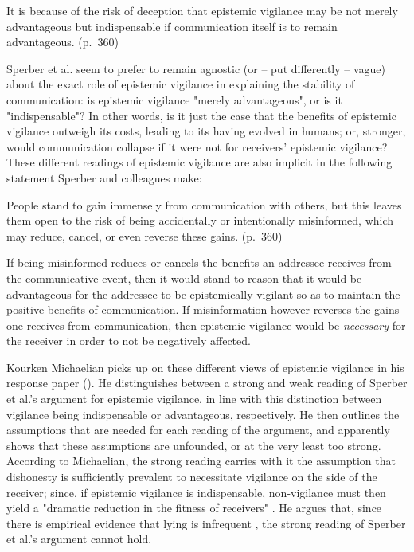 \begin{quoting}
    It is because of the risk of deception that epistemic vigilance may be not merely advantageous but indispensable if communication itself is to remain advantageous.
\hfill (p.~360)
\end{quoting}
Sperber et al. seem to prefer to remain agnostic (or -- put differently -- vague) about the exact role of epistemic vigilance in explaining the stability of communication: is epistemic vigilance "merely advantageous", or is it "indispensable"? In other words, is it just the case that the benefits of epistemic vigilance outweigh its costs, leading to its having evolved in humans; or, stronger, would communication collapse if it were not for receivers' epistemic vigilance?
These different readings of epistemic vigilance are also implicit in the following statement Sperber and colleagues make:
\begin{quoting}
    People stand to gain immensely from communication with others, but this leaves them open to the risk of being accidentally or intentionally misinformed, which may reduce, cancel, or even reverse these gains.
\hfill (p.~360)
\end{quoting}
If being misinformed reduces or cancels the benefits an addressee receives from the communicative event, then it would stand to reason that it would be advantageous for the addressee to be epistemically vigilant so as to maintain the positive benefits of communication. If misinformation however reverses the gains one receives from communication, then epistemic vigilance would be \emph{necessary} for the receiver in order to not be negatively affected.

Kourken Michaelian picks up on these different views of epistemic vigilance in his response paper (\citeyear{Michaelian13}). He distinguishes between a strong and weak reading of Sperber et al.'s argument for epistemic vigilance, in line with this distinction between vigilance being indispensable or advantageous, respectively.
He then outlines the assumptions that are needed for each reading of the argument, and apparently shows that these assumptions are unfounded, or at the very least too strong.
According to Michaelian, the strong reading carries with it the assumption that dishonesty is sufficiently prevalent to necessitate vigilance on the side of the receiver; since, if epistemic vigilance is indispensable, non-vigilance must then yield a "dramatic reduction in the fitness of receivers" \citep[p.~39]{Michaelian13}. He argues that, since there is empirical evidence that lying is infrequent \citep{Serota10}, the strong reading of Sperber et al.'s argument cannot hold.


